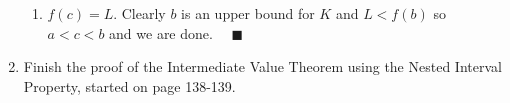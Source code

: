 \documentclass[12pt]{article}
\newcommand{\qed}{\quad \blacksquare}
\begin{document}
\begin{enumerate}
\begin{enumerate}
                \item $f(c) = L$. Clearly $b$ is an upper bound for $K$ and $L < f(b)$ so $a < c < b$ and we are done. $\qed$
            \end{enumerate}
        \color{black}

	\item Finish the proof of the Intermediate Value Theorem using the Nested Interval Property, started on page 138-139.
\end{enumerate}
\end{document}
